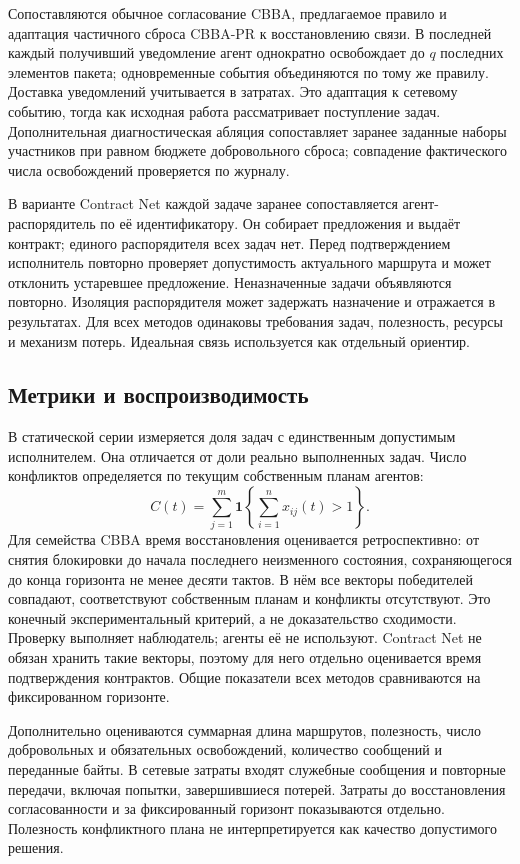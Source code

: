 \documentclass{misisarticle}
\begin{document}
Сопоставляются обычное согласование CBBA, предлагаемое правило и адаптация частичного сброса CBBA-PR к восстановлению связи. В последней каждый получивший уведомление агент однократно освобождает до $q$ последних элементов пакета; одновременные события объединяются по тому же правилу. Доставка уведомлений учитывается в затратах. Это адаптация к сетевому событию, тогда как исходная работа рассматривает поступление задач. Дополнительная диагностическая абляция сопоставляет заранее заданные наборы участников при равном бюджете добровольного сброса; совпадение фактического числа освобождений проверяется по журналу.

В варианте Contract Net каждой задаче заранее сопоставляется агент-распорядитель по её идентификатору. Он собирает предложения и выдаёт контракт; единого распорядителя всех задач нет. Перед подтверждением исполнитель повторно проверяет допустимость актуального маршрута и может отклонить устаревшее предложение. Неназначенные задачи объявляются повторно. Изоляция распорядителя может задержать назначение и отражается в результатах. Для всех методов одинаковы требования задач, полезность, ресурсы и механизм потерь. Идеальная связь используется как отдельный ориентир.

\subsection{Метрики и воспроизводимость}

В статической серии измеряется доля задач с единственным допустимым исполнителем. Она отличается от доли реально выполненных задач. Число конфликтов определяется по текущим собственным планам агентов:
\begin{equation}
 C(t)=\sum_{j=1}^{m}\mathbf 1\left\{\sum_{i=1}^{n}x_{ij}(t)>1\right\}.
\end{equation}
Для семейства CBBA время восстановления оценивается ретроспективно: от снятия блокировки до начала последнего неизменного состояния, сохраняющегося до конца горизонта не менее десяти тактов. В нём все векторы победителей совпадают, соответствуют собственным планам и конфликты отсутствуют. Это конечный экспериментальный критерий, а не доказательство сходимости. Проверку выполняет наблюдатель; агенты её не используют. Contract Net не обязан хранить такие векторы, поэтому для него отдельно оценивается время подтверждения контрактов. Общие показатели всех методов сравниваются на фиксированном горизонте.

Дополнительно оцениваются суммарная длина маршрутов, полезность, число добровольных и обязательных освобождений, количество сообщений и переданные байты. В сетевые затраты входят служебные сообщения и повторные передачи, включая попытки, завершившиеся потерей. Затраты до восстановления согласованности и за фиксированный горизонт показываются отдельно. Полезность конфликтного плана не интерпретируется как качество допустимого решения.
\end{document}
